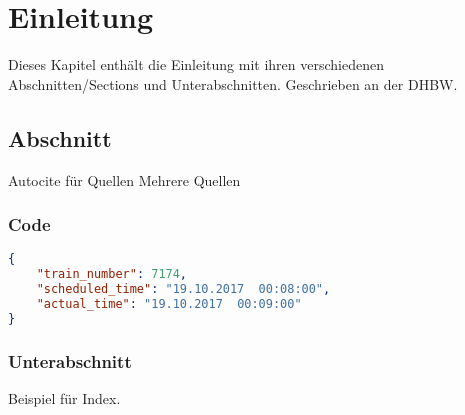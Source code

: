 \chapter{Einleitung}

Dieses Kapitel enthält die Einleitung mit ihren verschiedenen Abschnitten/Sections und
Unterabschnitten. Geschrieben an der \ac{DHBW}.

\section{Abschnitt}

Autocite für Quellen \autocite[Vgl.][S. 42]{ME12}
Mehrere Quellen \cites[Vgl.][S. 10]{ME12}[Vgl.][S. 100]{TD15}

\subsection{Code}

\begin{lstlisting}[language=json, caption=Nachrichtenformat eines neuen Zugereignisses, label={lst:generation}]
{
    "train_number": 7174,
    "scheduled_time": "19.10.2017  00:08:00",
    "actual_time": "19.10.2017  00:09:00"
}
\end{lstlisting}


\subsection{Unterabschnitt}

Beispiel für Index.
\lipsum 